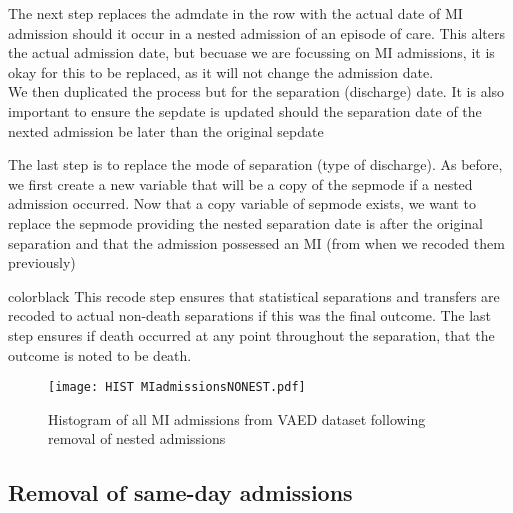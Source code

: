 \documentclass[11pt]{article}
\begin{document}
\color{violet}
\begin{stlog}\end{stlog}
\color{black}
The next step replaces the admdate in the row with the actual date of MI admission should it occur in a nested admission of an episode of care. This alters the actual admission date, but becuase we are focussing on MI admissions, it is okay for this to be replaced, as it will not change the admission date. \\
We then duplicated the process but for the separation (discharge) date. It is also important to ensure the sepdate is updated should the separation date of the nexted admission be later than the original sepdate
\color{violet}
\begin{stlog}\end{stlog}
\color{black}
The last step is to replace the mode of separation (type of discharge). As before, we first create a new variable that will be a copy of the sepmode if a nested admission occurred. Now that a copy variable of sepmode exists, we want to replace the sepmode providing the nested separation date is after the original separation and that the admission possessed an MI (from when we recoded them previously)
\color{violet}
\begin{stlog}\end{stlog}
color{black}
This recode step ensures that statistical separations and transfers are recoded to actual non-death separations if this was the final outcome. The last step ensures if death occurred at any point throughout the separation, that the outcome is noted to be death. 
\color{violet}
\begin{stlog}\end{stlog}
\color{black}
\begin{figure} 
	\centering
	\texttt{[image: HIST MIadmissionsNONEST.pdf]}
	\caption{Histogram of all MI admissions from VAED dataset following removal of nested admissions}
	\label{MI admissions NONEST}
\end{figure}
\color{violet}
\color{black}
\subsection{Removal of same-day admissions}
\color{violet}
\begin{stlog}\end{stlog}
\color{black}
\end{document}
